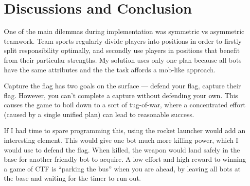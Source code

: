 \documentclass[a4paper,12pt]{article}
\begin{document}
\section{Discussions and Conclusion}




One of the main dilemmas during implementation was symmetric vs asymmetric teamwork. Team sports  regularly divide players into positions in order to firstly split responsibility optimally, and secondly use players in positions that benefit from their particular strengths. My solution uses only one plan because all bots have the same attributes and the the task affords a mob-like approach.

Capture the flag has two goals on the surface --- defend your flag, capture their flag. However, you can't complete a capture without defending your own. This causes the game to boil down to a sort of tug-of-war, where a concentrated effort (caused by a single unified plan) can lead to reasonable success.

If I had time to spare programming this, using the rocket launcher would add an interesting element. This would give one bot much more killing power, which I would use to defend the flag. When killed, the weapon would land safely in the base for another friendly bot to acquire. A low effort and high reward to winning a game of CTF is ``parking the bus'' when you are ahead, by leaving all bots at the base and waiting for the timer to run out.

\appendix
\end{document}
